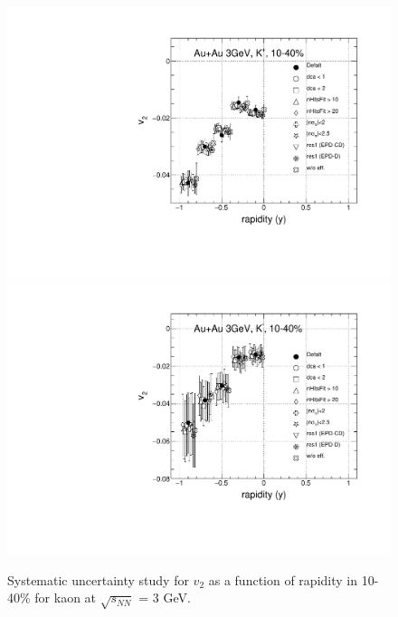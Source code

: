 \begin{figure}[h]
\includegraphics[scale=0.4]{chapter3/fig/sys/kaon/v2y_kp_sys.pdf}
\includegraphics[scale=0.4]{chapter3/fig/sys/kaon/v2y_km_sys.pdf}
\caption{Systematic uncertainty study for $v_{2}$ as a function of rapidity in 10-40\% for kaon at $\sqrt{s_{NN}}$ = 3 GeV.}
\label{pion_v1y_sys}
\end{figure}


